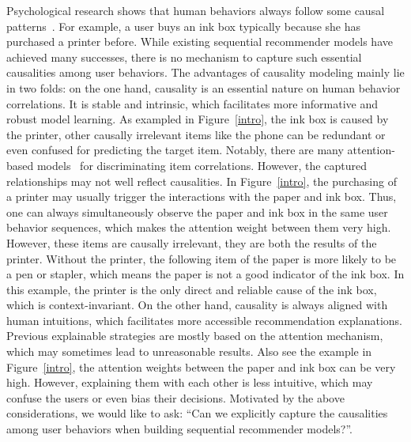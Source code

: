 \documentclass[conference]{IEEEtran}
\theoremstyle{definition}
\theoremstyle{theorem}
\theoremstyle{proof}
\theoremstyle{remark}
\begin{document}
{Psychological research shows that human behaviors always follow some causal patterns~\cite{rychlak1994logical,rychlak1986logical}.}
For example, a user buys an ink box typically because she has purchased a printer before.
While existing sequential recommender models have achieved many successes, there is no mechanism to capture such essential causalities among user behaviors.
The advantages of causality modeling mainly lie in two folds:
on the one hand, causality is an essential nature on human behavior correlations.
It is stable and intrinsic, which facilitates more informative and robust model learning. 
As exampled in Figure~\ref{intro}, the ink box is caused by the printer, other causally irrelevant items like the phone can be redundant or even confused for predicting the target item.
Notably, there are many attention-based models~\cite{li2017neural,liu2018stamp} for discriminating item correlations.
However, the captured relationships may not well reflect causalities.
In Figure~\ref{intro}, the purchasing of a printer may usually trigger the interactions with the paper and ink box.
Thus, one can always simultaneously observe the paper and ink box in the same user behavior sequences, which makes the attention weight between them very high.
However, these items are causally irrelevant, they are both the results of the printer.
Without the printer, the following item of the paper is more likely to be a pen or stapler, which means the paper is not a good indicator of the ink box.
In this example, the printer is the only direct and reliable cause of the ink box, which is context-invariant.
On the other hand, causality is always aligned with human intuitions, which facilitates more accessible recommendation explanations.
Previous explainable strategies are mostly based on the attention mechanism, which may sometimes lead to unreasonable results.
Also see the example in Figure~\ref{intro}, the attention weights between the paper and ink box can be very high.
However, explaining them with each other is less intuitive, which may confuse the users or even bias their decisions.
Motivated by the above considerations, we would like to ask: ``Can we explicitly capture the causalities among user behaviors when building sequential recommender models?''.
\end{document}
